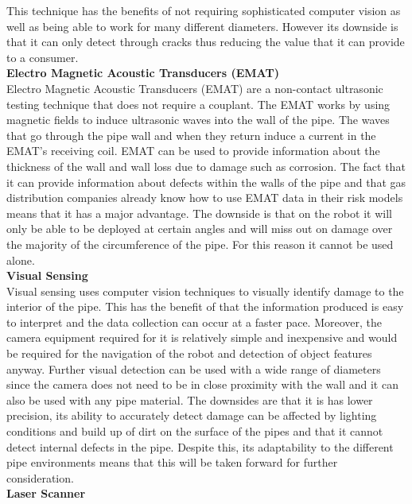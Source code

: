 \documentclass[11pt]{article}		%
\begin{document}
	        This technique has the benefits of not requiring sophisticated computer vision as well as being able to work for many different diameters. 
	        However its downside is that it can only detect through cracks thus reducing the value that it can provide to a consumer. 
	        \\
	        \textbf{Electro Magnetic Acoustic Transducers (EMAT)}
	        \\
	        Electro Magnetic Acoustic Transducers (EMAT) are a non-contact ultrasonic testing technique that does not require a couplant. 
	        The EMAT works by using magnetic fields to induce ultrasonic waves into the wall of the pipe.
	        The waves that go through the pipe wall and when they return induce a current in the EMAT’s receiving coil.
	        EMAT can be used to provide information about the thickness of the wall and wall loss due to damage such as corrosion. 
	        The fact that it can provide information about defects within the walls of the pipe and that gas distribution companies already know how to use EMAT data in their risk models means that it has a major advantage. 
	        The downside is that on the robot it will only be able to be deployed at certain angles and will miss out on damage over the majority of the circumference of the pipe. 
	        For this reason it  cannot be used alone.
			\\
			\textbf{Visual Sensing}
			\\
	        Visual sensing uses computer vision techniques to visually identify damage to the interior of the pipe. 
	        This has the benefit of that the information produced is easy to interpret and the data collection can occur at a faster pace. %
	        Moreover, the camera equipment required for it is relatively simple and inexpensive and would be required for the navigation of the robot and detection of object features anyway. 
	        Further visual detection can be used with a wide range of diameters since the camera does not need to be in close proximity with the wall and it can also be used with any pipe material. 
	        The downsides are that it is has lower precision, its ability to accurately detect damage can be affected by lighting conditions and build up of dirt on the surface of the pipes and  that it cannot detect internal defects in the pipe.
	        Despite this, its adaptability to the different pipe environments means that this will be taken forward for further consideration.
	        \\
	        \textbf{Laser Scanner}
\end{document}
